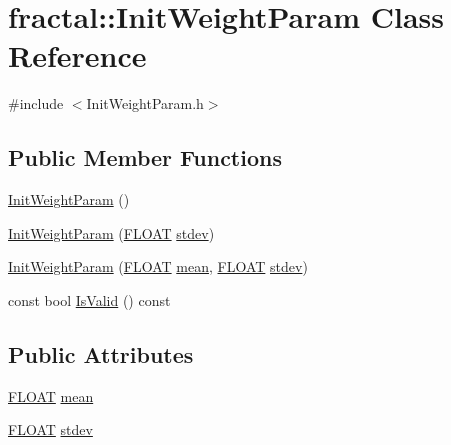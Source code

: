 \hypertarget{classfractal_1_1InitWeightParam}{\section{fractal\+:\+:Init\+Weight\+Param Class Reference}
\label{classfractal_1_1InitWeightParam}
}


{\ttfamily \#include $<$Init\+Weight\+Param.\+h$>$}

\subsection*{Public Member Functions}
\begin{DoxyCompactItemize}
\item 
\hyperlink{classfractal_1_1InitWeightParam_a6e3cd890172e284ff30db0a129f2fa7f}{Init\+Weight\+Param} ()
\item 
\hyperlink{classfractal_1_1InitWeightParam_a866e408e8c5767d886c78ce86ff63268}{Init\+Weight\+Param} (\hyperlink{namespacefractal_a1c2d2530689575d5ccb56bae52af70d3}{F\+L\+O\+A\+T} \hyperlink{classfractal_1_1InitWeightParam_ad2bf1b55480d3c4e4e6ff9557c246267}{stdev})
\item 
\hyperlink{classfractal_1_1InitWeightParam_a775dfc6bab902fa353fe852d12fb99fa}{Init\+Weight\+Param} (\hyperlink{namespacefractal_a1c2d2530689575d5ccb56bae52af70d3}{F\+L\+O\+A\+T} \hyperlink{classfractal_1_1InitWeightParam_af34e10c526d4f2bd0b3d610b1f899359}{mean}, \hyperlink{namespacefractal_a1c2d2530689575d5ccb56bae52af70d3}{F\+L\+O\+A\+T} \hyperlink{classfractal_1_1InitWeightParam_ad2bf1b55480d3c4e4e6ff9557c246267}{stdev})
\item 
const bool \hyperlink{classfractal_1_1InitWeightParam_adef209133b1589188935bcfb306b7e8a}{Is\+Valid} () const 
\end{DoxyCompactItemize}
\subsection*{Public Attributes}
\begin{DoxyCompactItemize}
\item 
\hyperlink{namespacefractal_a1c2d2530689575d5ccb56bae52af70d3}{F\+L\+O\+A\+T} \hyperlink{classfractal_1_1InitWeightParam_af34e10c526d4f2bd0b3d610b1f899359}{mean}
\item 
\hyperlink{namespacefractal_a1c2d2530689575d5ccb56bae52af70d3}{F\+L\+O\+A\+T} \hyperlink{classfractal_1_1InitWeightParam_ad2bf1b55480d3c4e4e6ff9557c246267}{stdev}
\end{DoxyCompactItemize}


